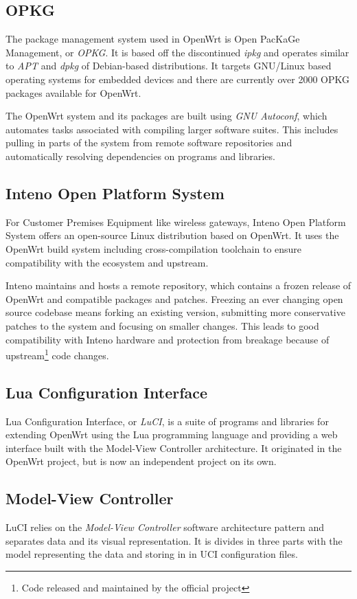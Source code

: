 \documentclass[a4paper,11pt,makeidx]{kth-bcs}
\begin{document}
\subsection{OPKG}
The package management system used in OpenWrt is Open PacKaGe Management, or \emph{OPKG}. It is based off the discontinued \emph{ipkg} and operates similar to \emph{APT} and \emph{dpkg} of Debian-based distributions.
It targets GNU/Linux based operating systems for embedded devices and there are currently over 2000 OPKG packages available for OpenWrt.

The OpenWrt system and its packages are built using \emph{GNU Autoconf}, which automates tasks associated with compiling larger software suites.
This includes pulling in parts of the system from remote software repositories and automatically resolving dependencies on programs and libraries.

\subsection{Inteno Open Platform System}
For Customer Premises Equipment like wireless gateways, Inteno Open Platform System offers an open-source Linux distribution based on OpenWrt.
It uses the OpenWrt build system including cross-compilation toolchain to ensure compatibility with the ecosystem and upstream.

Inteno maintains and hosts a remote repository, which contains a frozen release of OpenWrt and compatible packages and patches.
Freezing an ever changing open source codebase means forking an existing version, submitting more conservative patches to the system and focusing on smaller changes.
This leads to good compatibility with Inteno hardware and protection from breakage because of upstream\footnote{Code released and maintained by the official project} code changes.

\subsection{Lua Configuration Interface}\label{sec:LuCI}
Lua Configuration Interface, or \emph{LuCI}, is a suite of programs and libraries for extending OpenWrt using the Lua programming language and providing a web interface built with the Model-View Controller architecture.
It originated in the OpenWrt project, but is now an independent project on its own.

\subsection{Model-View Controller}
LuCI relies on the \emph{Model-View Controller} software architecture pattern and separates data and its visual representation.
It is divides in three parts with the model representing the data and storing in in UCI configuration files.
\end{document}
